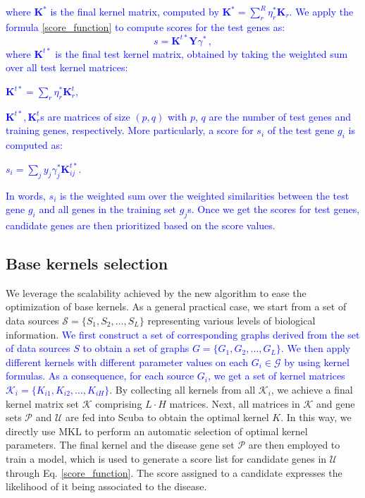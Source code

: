 \documentclass[twocolumn]{bmcart}%
\begin{document}
\textcolor{blue}{where $\textbf{K}^{*}$ is the final kernel matrix, computed by $\textbf{K}^{*} = \sum_{r}^R \eta_r^* \textbf{K}_r$. We apply the formula \ref{score_function} to compute scores for the test genes as:
\begin{equation}\label{score_function}
	s = \textbf{K}_{}^{t*} \textbf{Y} \gamma^{*} \, ,
\end{equation}
where $\textbf{K}_{}^{t*}$ is the final test kernel matrix, obtained by taking the weighted sum over all test kernel matrices:
\begin{center}
$\textbf{K}_{}^{t*} = \sum_{r}^{} \eta_{r}^{*} \textbf{K}_{r}^{t}$,
\end{center}
$\textbf{K}_{}^{t*}, \textbf{K}_{r}^{t}$s are matrices of size $(p,q)$ with $p$, $q$ are the number of test genes and training genes, respectively. More particularly, a score for $s_i$ of the test gene $g_i$ is computed as: 
\begin{center}
$s_i = \sum_{j}^{} y_j \gamma_{j}^* \textbf{K}_{ij}^{t*}$.
\end{center}
In words, $s_i$ is the weighted sum over the weighted similarities between the test gene $g_i$ and all genes in the training set $g_j$s. Once we get the scores for test genes, candidate genes are then prioritized based on the score values.
}
\subsection*{Base kernels selection}\label{basekernels}
We leverage the scalability achieved by the new algorithm to ease the optimization of base kernels. As a general practical case, we start from a set of data sources $\mathcal{S} = \lbrace S_1, S_2,\ldots, S_L \rbrace$ representing various levels of biological information. \textcolor{blue}{We first construct a set of corresponding graphs derived from the set of data sources $S$ to obtain a set of graphs $G = \lbrace G_1, G_2, \ldots, G_L\rbrace$. We then apply different kernels with different parameter values on each $G_i \in \mathcal{G}$ by using kernel formulas. As a consequence, for each source $G_i$, we get a set of kernel matrices $\mathcal{K}_i = \lbrace K_{i1}, K_{i2},\ldots, K_{iH} \rbrace$}. By collecting all kernels from all $\mathcal{K}_i$, we achieve a final kernel matrix set $\mathcal{K}$ comprising $L\cdot H$ matrices. Next, all matrices in $\mathcal{K}$ and gene sets $\mathcal{P}$ and $\mathcal{U}$ are fed into Scuba to obtain the optimal kernel $K$. In this way, we directly use MKL to perform an automatic selection of optimal kernel parameters. The final kernel and the disease gene set $\mathcal{P}$ are then employed to train a model, which is used to generate a score list for candidate genes in $\mathcal{U}$ through Eq. \ref{score_function}. The score assigned to a candidate expresses the likelihood of it being associated to the disease.  
\end{document}
